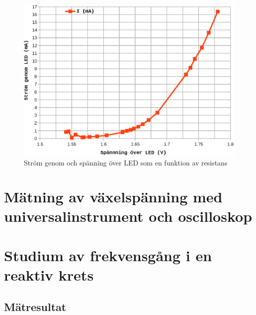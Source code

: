 \documentclass[11pt,a4paper]{article}
\begin{document}
\begin{figure}
    \centering
    \includegraphics[width=\linewidth]{img/6-led_data-graf2}
    \caption[Ström genom LED som funktion av spänning över LED]
    {Ström genom och spänning över LED som en funktion av resistans}
    \label{fig:led-data-graf2}
\end{figure}

\section{Mätning av växelspänning med universalinstrument och oscilloskop}\label{}


\section{Studium av frekvensgång i en reaktiv krets}\label{}

\subsection{Mätresultat}\label{}
\end{document}

